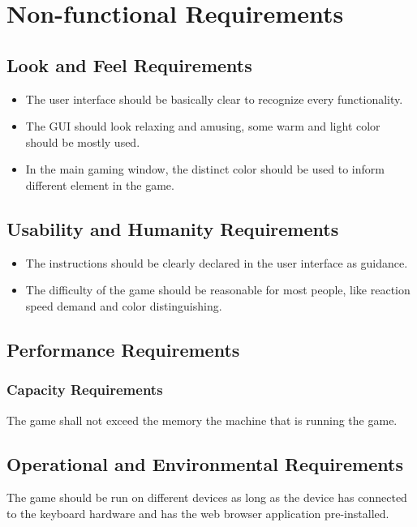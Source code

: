 \documentclass[12pt, titlepage]{article}
\begin{document}
\section{Non-functional Requirements}

\subsection{Look and Feel Requirements}

\begin{itemize}
\item The user interface should be basically clear to recognize every functionality. 
\item The GUI should look relaxing and amusing, some warm and light color should be mostly used.
\item In the main gaming window, the distinct color should be used to inform different element in the game.

\end{itemize}

\subsection{Usability and Humanity Requirements}
\begin{itemize}
\item The instructions should be clearly declared in the user interface as guidance. 
\item The difficulty of the game should be reasonable for most people, like reaction speed demand and color distinguishing.

\end{itemize}
\subsection{Performance Requirements}

\subsubsection{Capacity Requirements}
The game shall not exceed the memory the machine that is running the game.

\subsection{Operational and Environmental Requirements}
The game should be run on different devices as long as the device has connected to the keyboard hardware and has the web browser application pre-installed.
\end{document}
